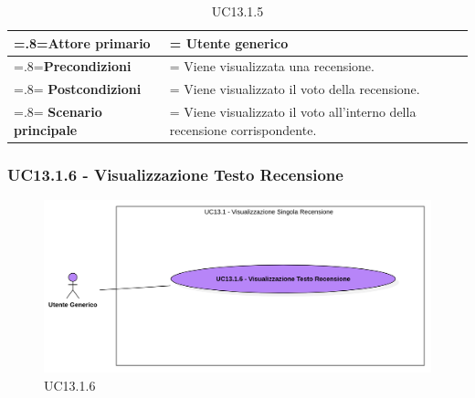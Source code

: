            \begin{table}[H]
                \centering
                \renewcommand{\arraystretch}{1.8}
                \renewcommand\tabularxcolumn[1]{m{#1}}
                \begin{tabularx}{0.9\textwidth} {
                    >{\hsize=.8\hsize\linewidth=\hsize}X
                    >{\hsize=1.2\hsize\linewidth=\hsize}X}
                    \hline
                    \textbf{Attore primario} & Utente generico \\
                    \hline
                    \textbf{Precondizioni} & Viene visualizzata una recensione. \\
                    \hline
                    \textbf{Postcondizioni} & Viene visualizzato il voto della recensione. \\
                    \hline
                    \textbf{Scenario principale} & Viene visualizzato il voto all'interno della recensione corrispondente. \\
                    \hline
                \end{tabularx}
                \caption{UC13.1.5}
            \end{table}

        \subsubsection{UC13.1.6 - Visualizzazione Testo Recensione}
        \label{UC13.1.6}

            \begin{figure}[H]
                \centering
                \includegraphics[scale=0.6]{src/img/UC13.1.6.png}
                \caption{UC13.1.6}
            \end{figure}

